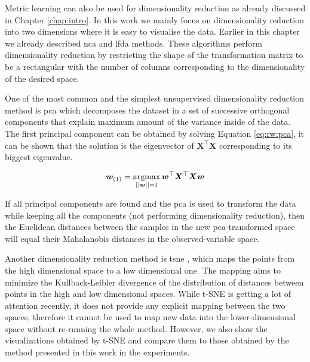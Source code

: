 \documentclass[12pt,a4paper]{report}
\begin{document}
Metric learning can also be used for dimensionality reduction as already discussed in Chapter \ref{chap:intro}. In this work we mainly focus on dimensionality reduction into two dimensions where it is easy to visualise the data. Earlier in this chapter we already described \ac{nca} and \ac{lfda} methods. These algorithms perform dimensionality reduction by restricting the shape of the transformation matrix to be a rectangular with the number of columns corresponding to the dimensionality of the desired space.

One of the most common and the simplest unsupervised dimensionality reduction method is \ac{pca} \citep{jolliffe2002principal} which decomposes the dataset in a set of successive orthogonal components that explain maximum amount of the variance inside of the data. The first principal component can be obtained by solving Equation \ref{eq:rw:pca}, it can be shown that the solution is the eigenvector of $\bm{X}^\top\bm{X}$ corresponding to its biggest eigenvalue.

\begin{equation} 
\bm{w}_{(1)} = \operatorname*{argmax}_{||\bm{w}||=1} \bm{w}^\top\bm{X}^\top\bm{X}\bm{w} \label{eq:rw:pca}
\end{equation}

If all principal components are found and the \ac{pca} is used to transform the data while keeping all the components (not performing dimensionality reduction), then the Euclidean distances between the samples in the new \ac{pca}-transformed space will equal their Mahalanobis distances in the observed-variable space.



Another dimensionality reduction method is \ac{tsne} \citep{maaten2008visualizing}, which maps the points from the high dimensional space to a low dimensional one. The mapping aims to minimize the Kullback-Leibler divergence of the distribution of distances between points in the high and low dimensional spaces. While t-SNE is getting a lot of attention recently, it does not provide any explicit mapping between the two spaces, therefore it cannot be used to map new data into the lower-dimensional space without re-running the whole method. However, we also show the visualizations obtained by t-SNE and compare them to those obtained by the method presented in this work in the experiments.
\end{document}
